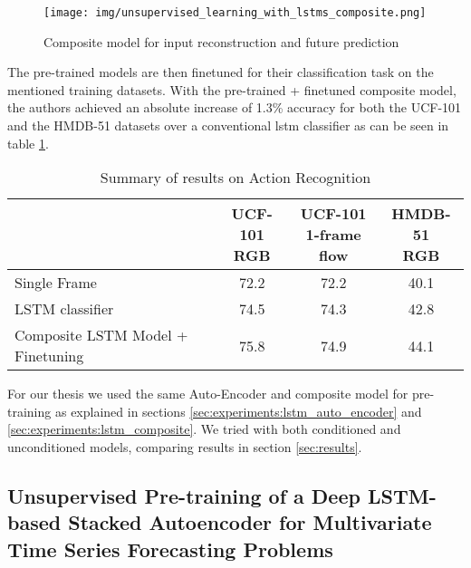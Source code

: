 \begin{figure}[h]
	\centering
	\texttt{[image: img/unsupervised\_learning\_with\_lstms\_composite.png]}
	\caption{Composite model for input reconstruction and future prediction \cite{unsupervised_learning_lstms}}
	\label{fig:stateofart:unsupervised_lstm_composite}
\end{figure}

The pre-trained models are then finetuned for their classification task on the mentioned training datasets.
With the pre-trained + finetuned composite model, the authors achieved an absolute increase of 1.3\% accuracy for both the UCF-101 and the HMDB-51 datasets over a conventional \gls{lstm} classifier as can be seen in table \ref{table:stateofart:unsupervised_learning_results}.

\begin{table}[]
	\begin{tabular}{l c c c}
		\thead{Model} & \thead{UCF-101 \\ RGB} & \thead{UCF-101
\\ 1-frame flow} & \thead{HMDB-51 \\
RGB} \\ \hline
		\midrule
		Single Frame & 72.2 & 72.2 & 40.1 \\
		\midrule
		LSTM classifier & 74.5 & 74.3 & 42.8 \\
		\midrule
		Composite LSTM
Model + Finetuning & 75.8 & 74.9 & 44.1 \\
	\end{tabular}
	\caption{Summary of results on Action Recognition \cite{unsupervised_learning_lstms}}
	\label{table:stateofart:unsupervised_learning_results}
\end{table}

For our thesis we used the same Auto-Encoder and composite model for pre-training as explained in sections \ref{sec:experiments:lstm_auto_encoder} and \ref{sec:experiments:lstm_composite}. We tried with both conditioned and unconditioned models, comparing results in section \ref{sec:results}.

\subsection{Unsupervised Pre-training of a Deep LSTM-based Stacked Autoencoder for Multivariate Time Series Forecasting Problems} \label{sec:stateofart:unsupervised_learning_lstms_timeseries}

